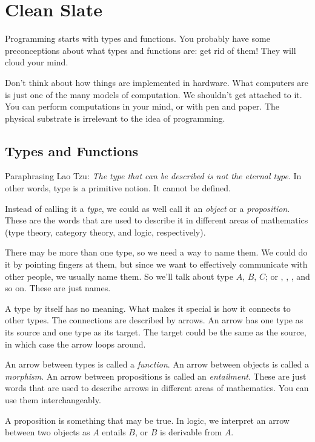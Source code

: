 \documentclass[DaoFP]{subfiles}
\begin{document}
\chapter{Clean Slate}

Programming starts with types and functions. You probably have some preconceptions about what types and functions are: get rid of them! They will cloud your mind.

Don't think about how things are implemented in hardware. What computers are is just one of the many models of computation. We shouldn't get attached to it. You can perform computations in your mind, or with pen and paper. The physical substrate is irrelevant to the idea of programming.

\section{Types and Functions}

Paraphrasing Lao Tzu: \emph{The type that can be described is not the eternal type}. In other words, type is a primitive notion. It cannot be defined.

Instead of calling it a \emph{type}, we could as well call it an \emph{object} or a \emph{proposition}. These are the words that are used to describe it in different areas of mathematics (type theory, category theory, and logic, respectively).

There may be more than one type, so we need a way to name them. We could do it by pointing fingers at them, but since we want to effectively communicate with other people, we usually name them. So we'll talk about type $A$, $B$, $C$; or , , , and so on. These are just names.

A type by itself has no meaning. What makes it special is how it connects to other types. The connections are described by arrows. An arrow has one type as its source and one type as its target. The target could be the same as the source, in which case the arrow loops around.

An arrow between types is called a \emph{function}. An arrow between objects is called a \emph{morphism}. An arrow between propositions is called an \emph{entailment}. These are just words that are used to describe arrows in different areas of mathematics. You can use them interchangeably.

A proposition is something that may be true. In logic, we interpret an arrow between two objects as $A$ entails $B$, or $B$ is derivable from $A$. 
\pagebreak
\end{document}
